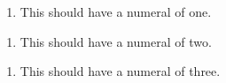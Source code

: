 \documentclass{article}
\begin{document}
\begin{enumerate}
\item This should have a numeral of one.
\end{enumerate}

\begin{mdframed}

\begin{enumerate}[resume]
\item This should have a numeral of two.
\end{enumerate}

\end{mdframed}

\begin{enumerate}[resume]
\item This should have a numeral of three.
\end{enumerate}
\end{document}
